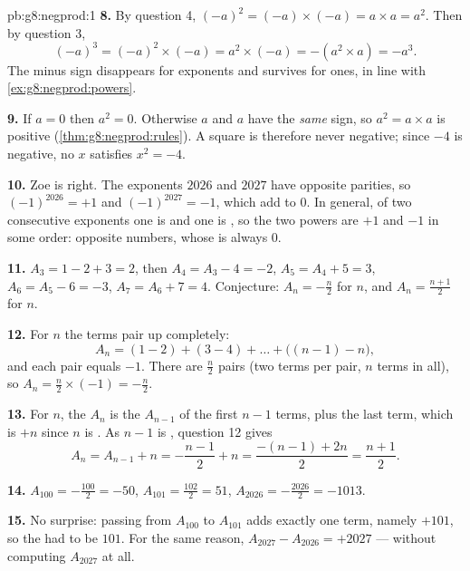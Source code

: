 \begin{solution}{pb:g8:negprod:1}
\textbf{8.} By question 4, $(-a)^2 = (-a) \times (-a) = a \times a =
a^2$. Then by question 3,
\[
(-a)^3 = (-a)^2 \times (-a) = a^2 \times (-a) = -(a^2 \times a)
= -a^3 .
\]
The minus sign disappears for  exponents and survives for 
ones, in line with \cref{ex:g8:negprod:powers}.

\textbf{9.} If $a = 0$ then $a^2 = 0$. Otherwise $a$ and $a$ have
the \emph{same} sign, so $a^2 = a \times a$ is positive
(\cref{thm:g8:negprod:rules}). A square is therefore never
negative; since $-4$ is negative, no  $x$ satisfies
$x^2 = -4$.

\textbf{10.} Zoe is right. The exponents $2026$ and $2027$ have
opposite parities, so $(-1)^{2026} = +1$ and $(-1)^{2027} = -1$,
which add to $0$. In general, of two consecutive exponents one is
 and one is , so the two powers are $+1$ and $-1$ in some
order: opposite numbers, whose  is always $0$.

\textbf{11.} $A_3 = 1 - 2 + 3 = 2$, then
$A_4 = A_3 - 4 = -2$, $A_5 = A_4 + 5 = 3$, $A_6 = A_5 - 6 = -3$,
$A_7 = A_6 + 7 = 4$. Conjecture: $A_n = -\frac{n}{2}$ for  $n$,
and $A_n = \frac{n+1}{2}$ for  $n$.

\textbf{12.} For  $n$ the terms pair up completely:
\[
A_n = (1 - 2) + (3 - 4) + \dots + \bigl((n-1) - n\bigr),
\]
and each pair equals $-1$. There are $\frac{n}{2}$ pairs (two terms
per pair, $n$ terms in all), so
$A_n = \frac{n}{2} \times (-1) = -\frac{n}{2}$.

\textbf{13.} For  $n$, the  $A_n$ is the  $A_{n-1}$ of the
first $n - 1$ terms, plus the last term, which is $+n$ since $n$ is
. As $n - 1$ is , question 12 gives
\[
A_n = A_{n-1} + n = -\frac{n-1}{2} + n
= \frac{-(n-1) + 2n}{2} = \frac{n+1}{2} .
\]

\textbf{14.} $A_{100} = -\frac{100}{2} = -50$, \quad
$A_{101} = \frac{102}{2} = 51$, \quad
$A_{2026} = -\frac{2026}{2} = -1013$.

\textbf{15.} No surprise: passing from $A_{100}$ to $A_{101}$ adds
exactly one term, namely $+101$, so the  had to be $101$.
For the same reason, $A_{2027} - A_{2026} = +2027$ --- without
computing $A_{2027}$ at all.
\end{solution}
